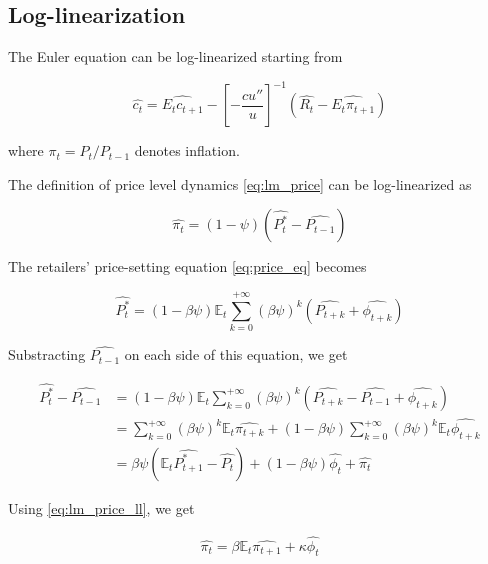 \subsection{Log-linearization}

The Euler equation can be log-linearized starting from

\begin{equation}
\widehat{c_t} = \widehat{E_t c_{t+1}} - \left[-\frac{c u''}{u} \right]^{-1} \left( \widehat{R_t} - \widehat{E_t \pi_{t+1}}\right)
\end{equation}

where $\pi_t = P_t / P_{t-1}$ denotes inflation.

The definition of price level dynamics \eqref{eq:lm_price} can be log-linearized as

\begin{equation}
\widehat{\pi_t} = (1-\psi) \left( \widehat{P_t^*} - \widehat{P_{t-1}} \right) \label{eq:lm_price_ll}
\end{equation}

The retailers' price-setting equation \eqref{eq:price_eq} becomes

\begin{equation}
\widehat{P_t^*} = (1-\beta\psi) \mathbb{E}_t \sum_{k=0}^{+\infty} (\beta\psi)^{k} \left( \widehat{P_{t+k}} + \widehat{\phi_{t+k}} \right)
\end{equation}

Substracting $\widehat{P_{t-1}}$ on each side of this equation, we get

\begin{align}
\widehat{P_t^*} - \widehat{P_{t-1}} &= (1-\beta\psi) \mathbb{E}_t \sum_{k=0}^{+\infty} (\beta\psi)^{k} \left( \widehat{P_{t+k}} - \widehat{P_{t-1}} + \widehat{\phi_{t+k}} \right)\\
&= \sum_{k=0}^{+\infty} (\beta\psi)^{k} \mathbb{E}_t \widehat{\pi_{t+k}} + (1-\beta\psi) \sum_{k=0}^{+\infty} (\beta\psi)^{k}  \mathbb{E}_t \widehat{\phi_{t+k}} \\
&= \beta \psi \left( \mathbb{E}_t \widehat{P_{t+1}^*} - \widehat{P_{t}} \right) + (1-\beta \psi) \widehat{\phi_t} + \widehat{\pi_t}
\end{align}

Using \eqref{eq:lm_price_ll}, we get

\begin{align}
\widehat{\pi_t} = \beta \mathbb{E}_t \widehat{\pi_{t+1}} + \kappa \widehat{\phi_t}
\end{align}

